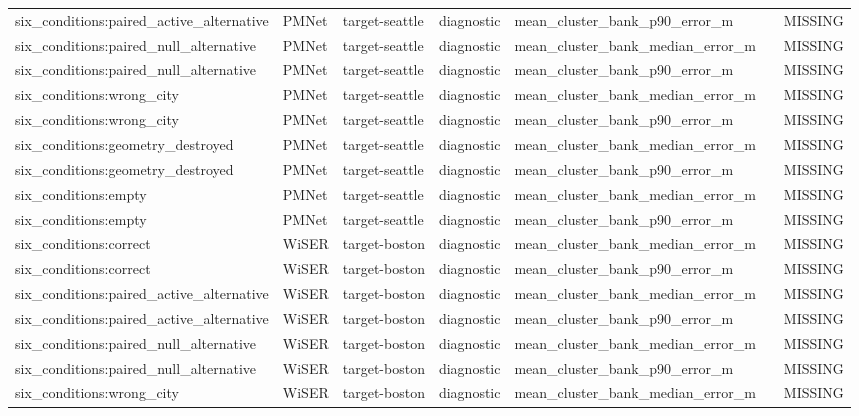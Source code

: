 \begin{longtable}{lllllll}
six\_conditions:paired\_active\_alternative & PMNet & target-seattle & diagnostic & mean\_cluster\_bank\_p90\_error\_m &  & MISSING \\
six\_conditions:paired\_null\_alternative & PMNet & target-seattle & diagnostic & mean\_cluster\_bank\_median\_error\_m &  & MISSING \\
six\_conditions:paired\_null\_alternative & PMNet & target-seattle & diagnostic & mean\_cluster\_bank\_p90\_error\_m &  & MISSING \\
six\_conditions:wrong\_city & PMNet & target-seattle & diagnostic & mean\_cluster\_bank\_median\_error\_m &  & MISSING \\
six\_conditions:wrong\_city & PMNet & target-seattle & diagnostic & mean\_cluster\_bank\_p90\_error\_m &  & MISSING \\
six\_conditions:geometry\_destroyed & PMNet & target-seattle & diagnostic & mean\_cluster\_bank\_median\_error\_m &  & MISSING \\
six\_conditions:geometry\_destroyed & PMNet & target-seattle & diagnostic & mean\_cluster\_bank\_p90\_error\_m &  & MISSING \\
six\_conditions:empty & PMNet & target-seattle & diagnostic & mean\_cluster\_bank\_median\_error\_m &  & MISSING \\
six\_conditions:empty & PMNet & target-seattle & diagnostic & mean\_cluster\_bank\_p90\_error\_m &  & MISSING \\
six\_conditions:correct & WiSER & target-boston & diagnostic & mean\_cluster\_bank\_median\_error\_m &  & MISSING \\
six\_conditions:correct & WiSER & target-boston & diagnostic & mean\_cluster\_bank\_p90\_error\_m &  & MISSING \\
six\_conditions:paired\_active\_alternative & WiSER & target-boston & diagnostic & mean\_cluster\_bank\_median\_error\_m &  & MISSING \\
six\_conditions:paired\_active\_alternative & WiSER & target-boston & diagnostic & mean\_cluster\_bank\_p90\_error\_m &  & MISSING \\
six\_conditions:paired\_null\_alternative & WiSER & target-boston & diagnostic & mean\_cluster\_bank\_median\_error\_m &  & MISSING \\
six\_conditions:paired\_null\_alternative & WiSER & target-boston & diagnostic & mean\_cluster\_bank\_p90\_error\_m &  & MISSING \\
six\_conditions:wrong\_city & WiSER & target-boston & diagnostic & mean\_cluster\_bank\_median\_error\_m &  & MISSING \\

\end{longtable}

